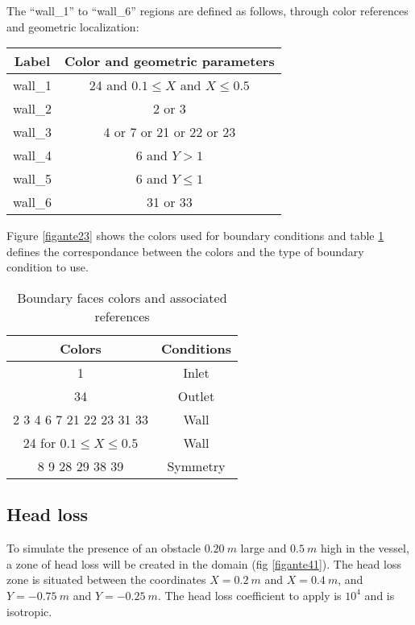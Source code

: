 The ``wall\_1'' to ``wall\_6'' regions are defined as follows, through color
references and geometric localization:
\begin{center}
\begin{tabular}{c|c}
Label & Color and geometric parameters \\
\hline
wall\_1 & 24 and $0.1\leqslant X$ and $X\leqslant 0.5$ \\
wall\_2 & 2 or 3 \\
wall\_3 & 4 or 7 or 21 or 22 or 23 \\
wall\_4 & 6 and $Y>1$ \\
wall\_5 & 6 and $Y\leqslant1$ \\
wall\_6 & 31 or 33 \\
\end{tabular}
\end{center}

Figure \ref{figante23} shows the colors used for boundary conditions and
table \ref{tabante41} defines the correspondance between the colors and
the type of boundary condition to use.

\begin{table}[htp]
\begin{center}
\begin{tabular}{|c|c|}
\hline
Colors & Conditions \\
\hline
1 & Inlet \\
\hline
34 & Outlet \\
\hline
2 3 4 6 7 21 22 23 31 33 & Wall \\
\hline
24 for $0.1 \leq X \leq 0.5$ & Wall \\
\hline
8 9 28 29 38 39 & Symmetry \\
\hline
\end{tabular}
\caption{Boundary faces colors and associated references}
\label{tabante41}
\end{center}
\end{table}



        \subsection{Head loss}

To simulate the presence of an obstacle $0.20\ m$ large and $0.5\ m$ high in the
vessel, a zone of head loss will be created in the domain (fig \ref{figante41}).
The head loss zone is situated between the coordinates $X=0.2\ m$ and $X=0.4\ m$,
and $Y=-0.75\ m$ and $Y=-0.25\ m$. The head loss coefficient to apply is $10^4$
and is isotropic.

